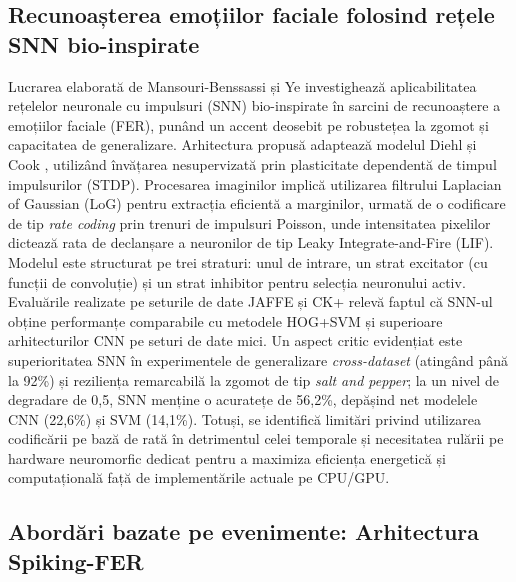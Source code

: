 \subsection*{Recunoașterea emoțiilor faciale folosind rețele SNN bio-inspirate}

Lucrarea elaborată de Mansouri-Benssassi și Ye \cite{mansouri2021} investighează aplicabilitatea rețelelor neuronale cu impulsuri (SNN) bio-inspirate în sarcini de recunoaștere a emoțiilor faciale (FER), punând un accent deosebit pe robustețea la zgomot și capacitatea de generalizare. Arhitectura propusă adaptează modelul Diehl și Cook \cite{diehl2015}, utilizând învățarea nesupervizată prin plasticitate dependentă de timpul impulsurilor (STDP). Procesarea imaginilor implică utilizarea filtrului Laplacian of Gaussian (LoG) pentru extracția eficientă a marginilor, urmată de o codificare de tip \textit{rate coding} prin trenuri de impulsuri Poisson, unde intensitatea pixelilor dictează rata de declanșare a neuronilor de tip Leaky Integrate-and-Fire (LIF). Modelul este structurat pe trei straturi: unul de intrare, un strat excitator (cu funcții de convoluție) și un strat inhibitor pentru selecția neuronului activ. Evaluările realizate pe seturile de date JAFFE și CK+ relevă faptul că SNN-ul obține performanțe comparabile cu metodele HOG+SVM și superioare arhitecturilor CNN pe seturi de date mici. Un aspect critic evidențiat este superioritatea SNN în experimentele de generalizare \textit{cross-dataset} (atingând până la 92\%) și reziliența remarcabilă la zgomot de tip \textit{salt and pepper}; la un nivel de degradare de 0,5, SNN menține o acuratețe de 56,2\%, depășind net modelele CNN (22,6\%) și SVM (14,1\%). Totuși, se identifică limitări privind utilizarea codificării pe bază de rată în detrimentul celei temporale și necesitatea rulării pe hardware neuromorfic dedicat pentru a maximiza eficiența energetică și computațională față de implementările actuale pe CPU/GPU.

\subsection*{Abordări bazate pe evenimente: Arhitectura Spiking-FER}

